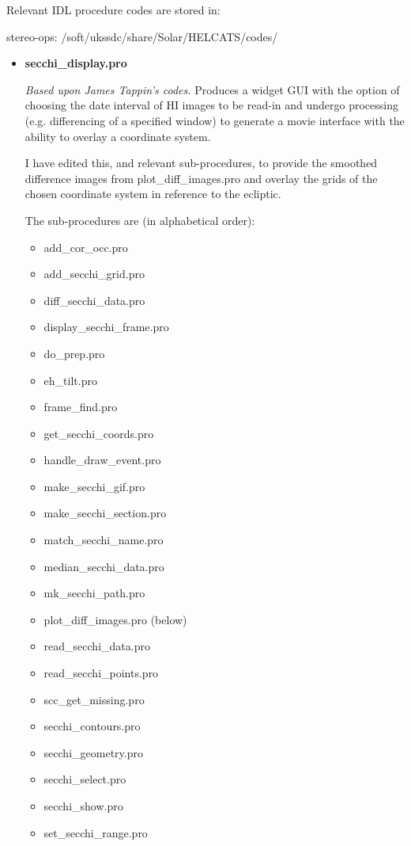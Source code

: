 \documentclass[12pt, a4paper, oneside]{article}
\begin{document}
Relevant IDL procedure codes are stored in:
 
stereo-ops: /soft/ukssdc/share/Solar/HELCATS/codes/

\begin{itemize}
\item {\bf secchi\_display.pro}

\textit{Based upon James Tappin's codes.} Produces a widget GUI with the option of choosing the date interval of HI images to be read-in and undergo processing (e.g. differencing of a specified window) to generate a movie interface with the ability to overlay a coordinate system. 

I have edited this, and relevant sub-procedures, to provide the smoothed difference images from plot\_diff\_images.pro and overlay the grids of the chosen coordinate system in reference to the ecliptic.

The sub-procedures are (in alphabetical order):

\begin{multicols}{3}
\begin{itemize}
\item add\_cor\_occ.pro
\item add\_secchi\_grid.pro
\item diff\_secchi\_data.pro	
\item display\_secchi\_frame.pro  	     
\item do\_prep.pro		  
\item eh\_tilt.pro		  
\item frame\_find.pro	   
\item get\_secchi\_coords.pro    
\item handle\_draw\_event.pro    
\item make\_secchi\_gif.pro	   
\item make\_secchi\_section.pro  
\item match\_secchi\_name.pro   
\item median\_secchi\_data.pro  
\item mk\_secchi\_path.pro	   
\item plot\_diff\_images.pro    (below)
\item read\_secchi\_data.pro    
\item read\_secchi\_points.pro  
\item scc\_get\_missing.pro	   
\item secchi\_contours.pro
\item secchi\_geometry.pro
\item secchi\_select.pro
\item secchi\_show.pro
\item set\_secchi\_range.pro


\end{itemize}
\end{multicols}
\end{itemize}
\end{document}
